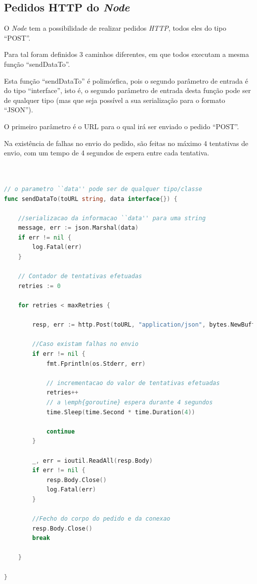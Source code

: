 \subsection{Pedidos \acs{HTTP} do \emph{Node}}
O \emph{Node} tem a possibilidade de realizar pedidos \emph{HTTP}, todos eles do tipo ``POST''.

Para tal foram definidos 3 caminhos diferentes, em que todos executam a mesma função ``sendDataTo''.

Esta função ``sendDataTo'' é polimórfica, pois o segundo parâmetro de entrada é do tipo ``interface'', isto é, o segundo parâmetro
de entrada desta função pode ser de qualquer tipo (mas que seja possível a sua serialização para o formato ``JSON'').

O primeiro parâmetro é o \acs{URL} para o qual irá ser enviado o pedido ``POST''.

Na existência de falhas no envio do pedido, são feitas no máximo 4 tentativas de envio, com um tempo de 4 segundos de espera entre cada tentativa.
\begin{lstlisting}[caption={\emph{Handler} ``myChanRoute'' do método ``/myChan''},language=Go]


// o parametro ``data'' pode ser de qualquer tipo/classe
func sendDataTo(toURL string, data interface{}) {

	//serializacao da informacao ``data'' para uma string
	message, err := json.Marshal(data)
	if err != nil {
		log.Fatal(err)
	}

	// Contador de tentativas efetuadas
	retries := 0

	for retries < maxRetries {

		resp, err := http.Post(toURL, "application/json", bytes.NewBuffer(message))

		//Caso existam falhas no envio
		if err != nil {
			fmt.Fprintln(os.Stderr, err)

			// incrementacao do valor de tentativas efetuadas
			retries++
			// a \emph{goroutine} espera durante 4 segundos
			time.Sleep(time.Second * time.Duration(4))

			continue
		}

		_, err = ioutil.ReadAll(resp.Body)
		if err != nil {
			resp.Body.Close()
			log.Fatal(err)
		}

		//Fecho do corpo do pedido e da conexao
		resp.Body.Close()
		break

	}

}

\end{lstlisting}


